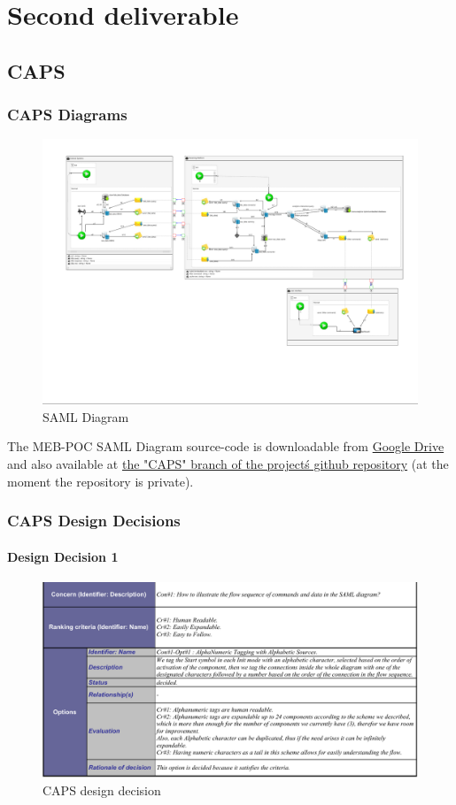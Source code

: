 \chapter{Second deliverable}
\section{CAPS}
\subsection{CAPS Diagrams}
\begin{figure}[H]
\centering
\includegraphics[trim={1.8cm 4cm 1cm 1.2cm},clip, width=\textwidth]{img/SAML.pdf}
\caption{SAML Diagram}
\end{figure}
The MEB-POC SAML Diagram source-code is downloadable from \href{https://drive.google.com/file/d/1ef9sZ7FFk_6fUsoZxO2Dyb8F9S59mnfx/view?usp=sharing}{Google Drive} and also available at \href{https://github.com/LuigiCerone/MEB-POC/tree/CAPS}{the "CAPS" branch of the project\'s github repository} (at the moment the repository is private).
\newpage
\subsection{CAPS Design Decisions}
\subsubsection{Design Decision 1}


\begin{figure}[H]
\centering
\includegraphics[width=\textwidth]{dd/DD-CAPS}
\caption{CAPS design decision}
\end{figure}

